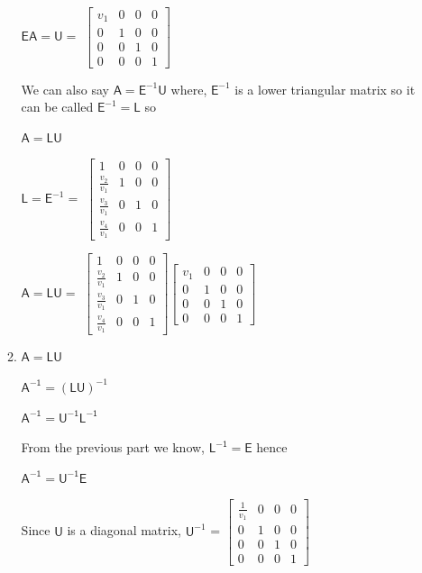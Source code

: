 \documentclass[a4paper, 11pt]{article}
\newcommand{\mat}[1]{\boldsymbol { \mathsf{#1}} }
\begin{document}
\begin{enumerate}
\begin{enumerate}[label=(\alph*)]
$\mat{E}\mat{A} = \mat{U} = $
$\begin{bmatrix} 
       v_1 & 0 & 0 & 0 \\ 
       0 & 1 & 0 & 0 \\
       0 & 0 & 1 & 0 \\
       0 & 0 & 0 & 1 
\end{bmatrix}$

We can also say $\mat{A} = \mat{E}^{-1}\mat{U}$ where, $\mat{E}^{-1}$ is a lower triangular matrix so it can be called $\mat{E}^{-1} = \mat{L}$ so

$\mat{A} = \mat{L}\mat{U}$

$\mat{L} = \mat{E}^{-1} = $
$\begin{bmatrix} 
       1 & 0 & 0 & 0 \\ 
       \frac{v_2}{v_1} & 1 & 0 & 0 \\
       \frac{v_3}{v_1} & 0 & 1 & 0 \\
       \frac{v_4}{v_1} & 0 & 0 & 1 
\end{bmatrix}$

$\mat{A} = \mat{L}\mat{U} = $
$\begin{bmatrix}
		1 & 0 & 0 & 0 \\ 
       \frac{v_2}{v_1} & 1 & 0 & 0 \\
       \frac{v_3}{v_1} & 0 & 1 & 0 \\
       \frac{v_4}{v_1} & 0 & 0 & 1 
\end{bmatrix}
\begin{bmatrix} 
       v_1 & 0 & 0 & 0 \\ 
       0 & 1 & 0 & 0 \\
       0 & 0 & 1 & 0 \\
       0 & 0 & 0 & 1 
\end{bmatrix}$

\item $\mat{A} = \mat{LU}$

$\mat{A^{-1}} = (\mat{LU})^{-1}$

$\mat{A^{-1}} = \mat{U^{-1}L^{-1}}$

From the previous part we know, $\mat{L^{-1}} = \mat{E}$ hence

$\mat{A^{-1}} = \mat{U^{-1}E}$

Since $\mat{U}$ is a diagonal matrix, $\mat{U}^{-1}$ =
$\begin{bmatrix} 
       \frac{1}{v_1} & 0 & 0 & 0 \\ 
       0 & 1 & 0 & 0 \\
       0 & 0 & 1 & 0 \\
       0 & 0 & 0 & 1 
\end{bmatrix}$ 


\end{enumerate}
\end{enumerate}
\end{document}
